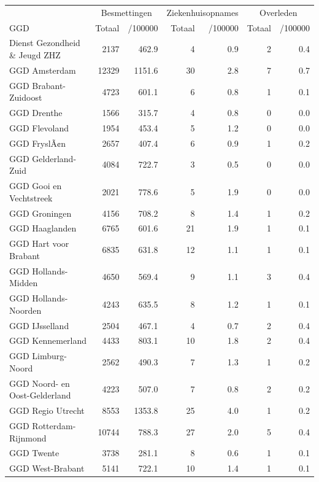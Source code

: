\documentclass[
  english,
  man,floatsintext]{apa6}
\begin{document}
\begin{table}
\centering\begingroup\fontsize{10}{12}\selectfont

\begin{threeparttable}
\begin{tabular}{lrrrrrr}
\toprule
\multicolumn{1}{c}{ } & \multicolumn{2}{c}{Besmettingen} & \multicolumn{2}{c}{Ziekenhuisopnames} & \multicolumn{2}{c}{Overleden} \\
\cmidrule(l{3pt}r{3pt}){2-3} \cmidrule(l{3pt}r{3pt}){4-5} \cmidrule(l{3pt}r{3pt}){6-7}
GGD & Totaal & /100000 & Totaal & /100000 & Totaal & /100000\\
\midrule
Dienst Gezondheid \& Jeugd ZHZ & 2137 & 462.9 & 4 & 0.9 & 2 & 0.4\\
GGD Amsterdam & 12329 & 1151.6 & 30 & 2.8 & 7 & 0.7\\
GGD Brabant-Zuidoost & 4723 & 601.1 & 6 & 0.8 & 1 & 0.1\\
GGD Drenthe & 1566 & 315.7 & 4 & 0.8 & 0 & 0.0\\
GGD Flevoland & 1954 & 453.4 & 5 & 1.2 & 0 & 0.0\\
GGD FryslÃ¢n & 2657 & 407.4 & 6 & 0.9 & 1 & 0.2\\
GGD Gelderland-Zuid & 4084 & 722.7 & 3 & 0.5 & 0 & 0.0\\
GGD Gooi en Vechtstreek & 2021 & 778.6 & 5 & 1.9 & 0 & 0.0\\
GGD Groningen & 4156 & 708.2 & 8 & 1.4 & 1 & 0.2\\
GGD Haaglanden & 6765 & 601.6 & 21 & 1.9 & 1 & 0.1\\
GGD Hart voor Brabant & 6835 & 631.8 & 12 & 1.1 & 1 & 0.1\\
GGD Hollands-Midden & 4650 & 569.4 & 9 & 1.1 & 3 & 0.4\\
GGD Hollands-Noorden & 4243 & 635.5 & 8 & 1.2 & 1 & 0.1\\
GGD IJsselland & 2504 & 467.1 & 4 & 0.7 & 2 & 0.4\\
GGD Kennemerland & 4433 & 803.1 & 10 & 1.8 & 2 & 0.4\\
GGD Limburg-Noord & 2562 & 490.3 & 7 & 1.3 & 1 & 0.2\\
GGD Noord- en Oost-Gelderland & 4223 & 507.0 & 7 & 0.8 & 2 & 0.2\\
GGD Regio Utrecht & 8553 & 1353.8 & 25 & 4.0 & 1 & 0.2\\
GGD Rotterdam-Rijnmond & 10744 & 788.3 & 27 & 2.0 & 5 & 0.4\\
GGD Twente & 3738 & 281.1 & 8 & 0.6 & 1 & 0.1\\
GGD West-Brabant & 5141 & 722.1 & 10 & 1.4 & 1 & 0.1\\

\end{tabular}
\end{threeparttable}
\end{table}
\end{document}
